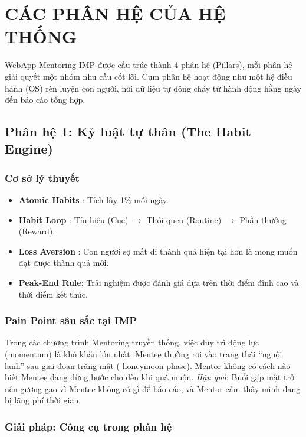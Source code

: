 \chapter{CÁC PHÂN HỆ CỦA HỆ THỐNG}
WebApp Mentoring IMP được cấu trúc thành 4 phân hệ (Pillars), mỗi phân hệ giải quyết một nhóm nhu cầu cốt lõi. Cụm phân hệ hoạt động như một hệ điều hành (OS) rèn luyện con người, nơi dữ liệu tự động chảy từ hành động hằng ngày đến báo cáo tổng hợp.

\section{Phân hệ 1: Kỷ luật tự thân (The Habit Engine)}

\subsection{Cơ sở lý thuyết}
\begin{itemize}
  \item \textbf{Atomic Habits} \citep{atomichabits2018}: Tích lũy 1\% mỗi ngày.
  \item \textbf{Habit Loop} \citep{duhigg2012}: Tín hiệu (Cue) $\to$ Thói quen (Routine) $\to$ Phần thưởng (Reward).
  \item \textbf{Loss Aversion} \citep{kahneman1979}: Con người sợ mất đi thành quả hiện tại hơn là mong muốn đạt được thành quả mới.
  \item \textbf{Peak-End Rule}: Trải nghiệm được đánh giá dựa trên thời điểm đỉnh cao và thời điểm kết thúc.
\end{itemize}

\subsection{Pain Point sâu sắc tại IMP}
Trong các chương trình Mentoring truyền thống, việc duy trì động lực (momentum) là khó khăn lớn nhất. Mentee thường rơi vào trạng thái ``nguội lạnh'' sau giai đoạn trăng mật ( honeymoon phase). Mentor không có cách nào biết Mentee đang dừng bước cho đến khi quá muộn.
\textit{Hậu quả}: Buổi gặp mặt trở nên gượng gạo vì Mentee không có gì để báo cáo, và Mentor cảm thấy mình đang bị lãng phí thời gian.

\subsection{Giải pháp: Công cụ trong phân hệ}


